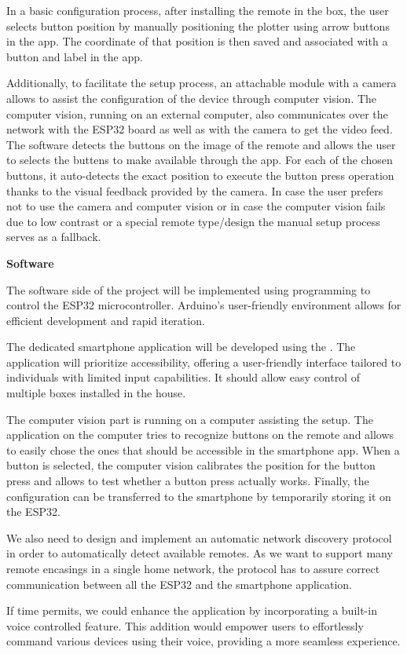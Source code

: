 In a basic configuration process, after installing the remote in the box, the user selects button position by manually positioning the plotter using arrow buttons in the app.
The coordinate of that position is then saved and associated with a button and label in the app.

Additionally, to facilitate the setup process, an attachable module with a camera allows to assist the configuration of the device through computer vision.
The computer vision, running on an external computer, also communicates over the network with the ESP32 board as well as with the camera to get the video feed.
The software detects the buttons on the image of the remote and allows the user to selects the buttens to make available through the app.
For each of the chosen buttons, it auto-detects the exact position to execute the button press operation thanks to the visual feedback provided by the camera.
In case the user prefers not to use the camera and computer vision or in case the computer vision fails due to low contrast or a special remote type/design the manual setup process serves as a fallback. 


\textbf{Software}

The software side of the project will be implemented using  programming to control the ESP32 microcontroller.
Arduino's user-friendly environment allows for efficient development and rapid iteration.

The dedicated smartphone application will be developed using the .
The application will prioritize accessibility, offering a user-friendly interface tailored to individuals with limited input capabilities.
It should allow easy control of multiple boxes installed in the house.

The computer vision part is running on a computer assisting the setup. 
The application on the computer tries to recognize buttons on the remote and allows to easily chose the ones that should be accessible in the smartphone app.
When a button is selected, the computer vision calibrates the position for the button press and allows to test whether a button press actually works.
Finally, the configuration can be transferred to the smartphone by temporarily storing it on the ESP32.

We also need to design and implement an automatic network discovery protocol in order to automatically detect available remotes.
As we want to support many remote encasings in a single home network, the protocol has to assure correct communication between all the ESP32 and the smartphone application.

If time permits, we could enhance the application by incorporating a built-in voice controlled feature.
This addition would empower users to effortlessly command various devices using their voice, providing a more seamless experience.
